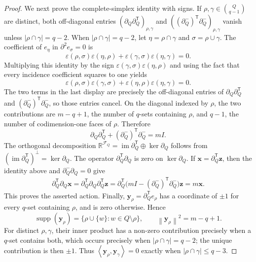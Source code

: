 \documentclass[11pt]{article}
\newcommand{\R}{\mathbb{R}}
\newcommand{\im}{\operatorname{im}}
\newcommand{\Ker}{\operatorname{ker}}
\newcommand{\supp}{\operatorname{supp}}
\newcommand{\bd}{\partial}
\newcommand{\ip}[2]{\left\langle #1,#2\right\rangle}
\newcommand{\norm}[1]{\left\lVert #1\right\rVert}
\newcommand{\calF}{\mathcal{F}}
\begin{document}
\begin{proof}
	We next prove the complete-simplex identity with signs. If
	\(\rho,\gamma\in\binom Q{q-1}\) are distinct, both off-diagonal entries
	\((\bd_Q\bd_Q^{\mathsf T})_{\rho,\gamma}\) and
	\(((\bd_Q^-)^{\mathsf T}\bd_Q^-)_{\rho,\gamma}\) vanish unless
	\(|\rho\cap\gamma|=q-2\). When \(|\rho\cap\gamma|=q-2\), let
	\(\eta=\rho\cap\gamma\) and \(\sigma=\rho\cup\gamma\). The coefficient of
	\(e_\eta\) in \(\bd^2e_\sigma=0\) is
	\[
	\varepsilon(\rho,\sigma)\varepsilon(\eta,\rho)
	+\varepsilon(\gamma,\sigma)\varepsilon(\eta,\gamma)=0.
	\]
	Multiplying this identity by the sign
	\(\varepsilon(\gamma,\sigma)\varepsilon(\eta,\rho)\) and using the fact that
	every incidence coefficient squares to one yields
	\[
	\varepsilon(\rho,\sigma)\varepsilon(\gamma,\sigma)
	+\varepsilon(\eta,\rho)\varepsilon(\eta,\gamma)=0.
	\]
	The two terms in the last display are precisely the off-diagonal entries
	of \(\bd_Q\bd_Q^{\mathsf T}\) and
	\((\bd_Q^-)^{\mathsf T}\bd_Q^-\), so those entries cancel.
	On the diagonal indexed by \(\rho\), the two contributions are
	\(m-q+1\), the number of \(q\)-sets containing \(\rho\), and \(q-1\),
	the number of codimension-one faces of \(\rho\). Therefore
	\[
	\bd_Q\bd_Q^{\mathsf T}+(\bd_Q^-)^{\mathsf T}\bd_Q^-=mI.
	\]
	The orthogonal decomposition
	$\R^{\calF_Q}=\im\bd_Q^{\mathsf T}\oplus\Ker\bd_Q$
	follows from \((\im\bd_Q^{\mathsf T})^\perp=\Ker\bd_Q\). The
	operator \(\bd_Q^{\mathsf T}\bd_Q\) is zero on \(\Ker\bd_Q\).
	If \(\mathbf x=\bd_Q^{\mathsf T}\mathbf z\), then the identity above and
	\(\bd_Q^-\bd_Q=0\) give
	\begin{align*}
		\bd_Q^{\mathsf T}\bd_Q\mathbf x=\bd_Q^{\mathsf T}\bd_Q\bd_Q^{\mathsf T}\mathbf z=\bd_Q^{\mathsf T}
		\bigl(mI-(\bd_Q^-)^{\mathsf T}\bd_Q^-\bigr)\mathbf z
		=m\mathbf x.
	\end{align*}
	This proves the asserted action.
	Finally, \(\mathbf y_\rho=\bd_Q^{\mathsf T}e_\rho\) has a coordinate of
	\(\pm1\) for every \(q\)-set containing \(\rho\), and is zero otherwise. Hence
	\[
	\supp(\mathbf y_\rho)=\{\rho\cup\{w\}:w\in Q\setminus\rho\},
	\qquad \norm{\mathbf y_\rho}^2=m-q+1.
	\]
	For distinct \(\rho,\gamma\), their inner product has a non-zero contribution precisely
	when a \(q\)-set contains both, which occurs precisely when
	\(|\rho\cap\gamma|=q-2\); the unique contribution is then \(\pm1\). Thus
	\(\ip{\mathbf y_\rho}{\mathbf y_\gamma}=0\) exactly when
	\(|\rho\cap\gamma|\le q-3\).
\end{proof}
	
\end{document}
